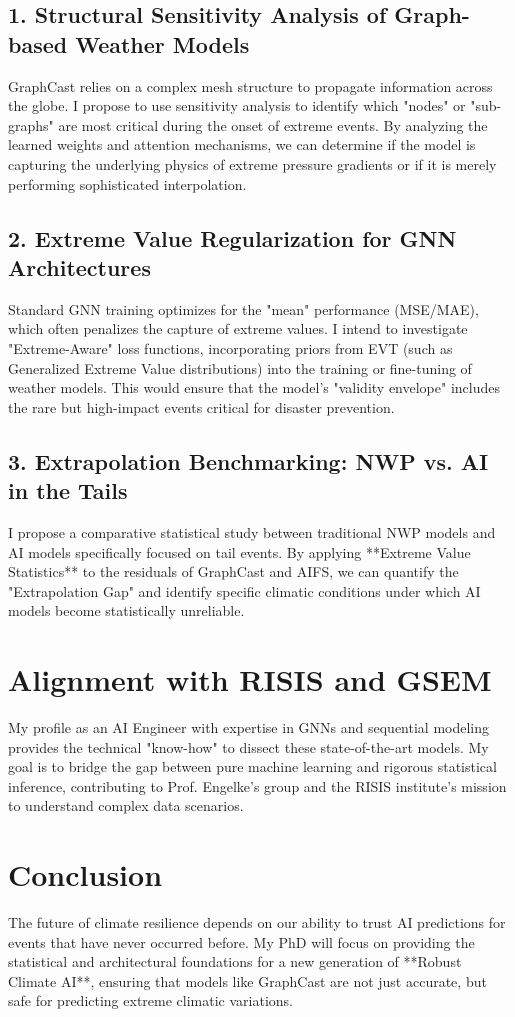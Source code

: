 \documentclass[11pt,a4paper]{article}
\begin{document}
\subsection{1. Structural Sensitivity Analysis of Graph-based Weather Models}
GraphCast relies on a complex mesh structure to propagate information across the globe. I propose to use sensitivity analysis to identify which "nodes" or "sub-graphs" are most critical during the onset of extreme events. By analyzing the learned weights and attention mechanisms, we can determine if the model is capturing the underlying physics of extreme pressure gradients or if it is merely performing sophisticated interpolation.

\subsection{2. Extreme Value Regularization for GNN Architectures}
Standard GNN training optimizes for the "mean" performance (MSE/MAE), which often penalizes the capture of extreme values. I intend to investigate "Extreme-Aware" loss functions, incorporating priors from EVT (such as Generalized Extreme Value distributions) into the training or fine-tuning of weather models. This would ensure that the model's "validity envelope" includes the rare but high-impact events critical for disaster prevention.

\subsection{3. Extrapolation Benchmarking: NWP vs. AI in the Tails}
I propose a comparative statistical study between traditional NWP models and AI models specifically focused on tail events. By applying **Extreme Value Statistics** to the residuals of GraphCast and AIFS, we can quantify the "Extrapolation Gap" and identify specific climatic conditions under which AI models become statistically unreliable.

\section{Alignment with RISIS and GSEM}
My profile as an AI Engineer with expertise in GNNs and sequential modeling provides the technical "know-how" to dissect these state-of-the-art models. My goal is to bridge the gap between pure machine learning and rigorous statistical inference, contributing to Prof. Engelke’s group and the RISIS institute's mission to understand complex data scenarios.

\section{Conclusion}
The future of climate resilience depends on our ability to trust AI predictions for events that have never occurred before. My PhD will focus on providing the statistical and architectural foundations for a new generation of **Robust Climate AI**, ensuring that models like GraphCast are not just accurate, but safe for predicting extreme climatic variations.
\end{document}

